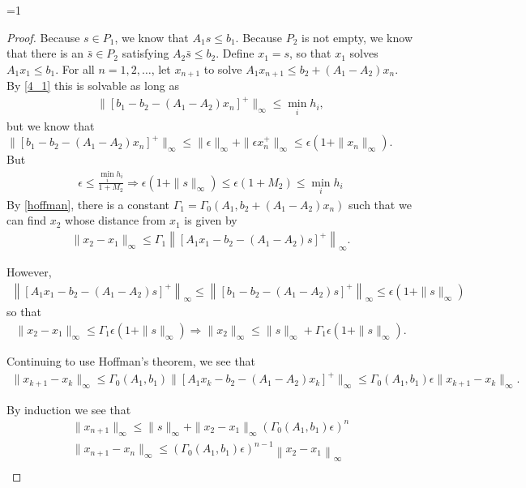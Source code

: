 \documentclass{article}
\theoremstyle{case}
\def\includeproofs{1}
\begin{document}
\ifnum\includeproofs=1
\begin{proof}
Because $s \in P_1$, we know that $A_1s \le b_1$.
Because $P_2$ is not empty, we know that there is an $\bar s  \in P_2$ satisfying $A_2\bar s \le b_2$.
Define $x_1 = s$, so that $x_1$ solves $A_1x_1 \le b_1$.
For all $n = 1, 2, \ldots$, let $x_{n+1}$ to solve
$A_1 x_{n+1} \le b_2 + (A_1 - A_2) x_n$.
By \cref{4_1} this is solvable as long as
\begin{align*}
\|[b_1 - b_2 - (A_1 - A_2)x_n]^+\|_\infty \le \min_i h_i,
\end{align*}
but we know that $\|[b_1 - b_2 - (A_1 - A_2)x_n]^+\|_{\infty} \le \|\epsilon\|_\infty + \|\epsilon x_n^+\|_{\infty} \le \epsilon(1 + \|x_n\|_\infty)$.
But 
\begin{align*}
\epsilon \le \frac{\min_i h_i}{1 + M_2} \Longrightarrow
\epsilon(1 + \|s\|_\infty) \le \epsilon(1 + M_2) \le \min_i h_i
\end{align*}
By \cref{hoffman}, there is a constant $\Gamma_1 = \Gamma_0(A_1, b_2 + (A_1 - A_2)x_n)$ such that we can find $x_2$ whose distance from $x_1$ is given by
\begin{align*}
\|x_2 - x_1\|_\infty \le \Gamma_1 \left\|[A_1x_1 - b_2 - (A_1 - A_2)s]^+\right\|_\infty.
\end{align*}

However,
\begin{align*}
\left\|[A_1x_1 - b_2 - (A_1 - A_2)s]^+\right\|_\infty \le \left\|[b_1 - b_2 - (A_1 - A_2)s]^+\right\|_\infty \le \epsilon(1 + \|s\|_\infty)
\end{align*}
so that
\begin{align*}
\|x_2 - x_1\|_\infty \le \Gamma_1  \epsilon(1 + \|s\|_\infty)
\Longrightarrow \|x_2\|_\infty \le \|s\| _\infty+ \Gamma_1  \epsilon(1 + \|s\|_\infty).
\end{align*}

Continuing to use Hoffman's theorem, we see that 
\begin{align*}
\|x_{k+1} - x_{k}\|_\infty \le \Gamma_0(A_1, b_1)\|[A_1x_k - b_2 - (A_1 - A_2)x_k]^+\|_\infty \le \Gamma_0(A_1, b_1) \epsilon \|x_{k+1}-x_k\|_\infty.
\end{align*}

By induction we see that
\begin{align*}
\|x_{n+1}\|_\infty \le \|s\|_\infty + \|x_2 - x_1\|_\infty \left(\Gamma_0(A_1, b_1)\epsilon\right)^n \\
\|x_{n+1} - x_n\|_\infty \le \left(\Gamma_0(A_1, b_1)\epsilon\right)^{n-1}\left\|x_2 - x_1\right\|_\infty \\
\end{align*}


\end{proof}
\end{document}
